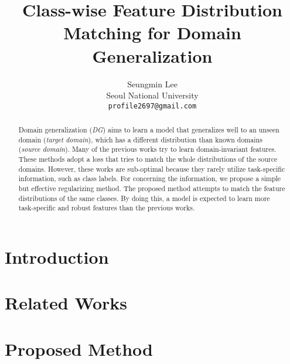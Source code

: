 \documentclass[10pt,twocolumn,letterpaper]{article}
\begin{document}
\title{Class-wise Feature Distribution Matching for Domain Generalization}

\author{Seungmin Lee\\
Seoul National University\\
{\tt\small profile2697@gmail.com}
}

\maketitle

\begin{abstract}
 Domain generalization (\textit{DG}) aims to learn a model that generalizes well to an unseen domain (\textit{target domain}), which has a different distribution than known domains (\textit{source domain}). Many of the previous works try to learn domain-invariant features. These methods adopt a loss that tries to match the whole distributions of the source domains. However, these works are sub-optimal because they rarely utilize task-specific information, such as class labels. For concerning the information, we propose a simple but effective regularizing method. The proposed method attempts to match the feature distributions of the same classes. By doing this, a model is expected to learn more task-specific and robust features than the previous works.
\end{abstract}

\section{Introduction}


\section{Related Works}


\section{Proposed Method}



{\small


}
\end{document}
